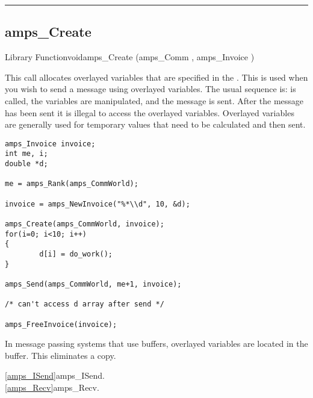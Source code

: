 \noindent\rule{\textwidth}{1mm}

\subsection{amps\_Create}
\label{amps_Create}


\begin{deftypefn}{Library Function}{void}{amps\_Create}
(amps_Comm , amps_Invoice )

\DESCRIPTION

This call allocates overlayed variables that are specified in the
.  This is used when you wish to send a message using
overlayed variables.  The usual sequence is:  is
called, the variables are manipulated, and the message is sent.  After
the message has been sent it is illegal to access the overlayed
variables.  Overlayed variables are generally used for temporary values
that need to be calculated and then sent.

\EXAMPLE
\begin{display}\begin{verbatim}
amps_Invoice invoice;
int me, i;
double *d;

me = amps_Rank(amps_CommWorld);

invoice = amps_NewInvoice("%*\\d", 10, &d);

amps_Create(amps_CommWorld, invoice);
for(i=0; i<10; i++)
{
        d[i] = do_work();
}

amps_Send(amps_CommWorld, me+1, invoice);

/* can't access d array after send */

amps_FreeInvoice(invoice);

\end{verbatim}\end{display}

\NOTES
In message passing systems that use buffers, overlayed variables are
located in the buffer.  This eliminates a copy.

\SEEALSO
\vref{amps_ISend}{amps\_ISend}. \\
\vref{amps_Recv}{amps\_Recv}. \\

\end{deftypefn}

